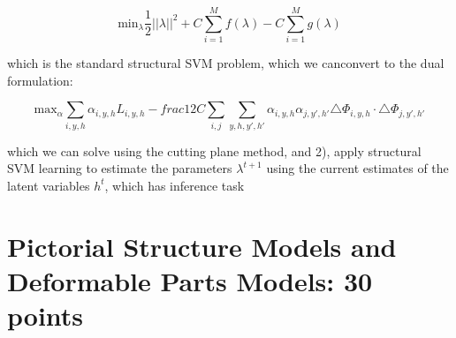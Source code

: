 \documentclass[10pt,onecolumn,letterpaper]{article}
\begin{document}
\begin{enumerate}
$$ \text{min}_\lambda \frac{1}{2}||\lambda||^2 + C\sum_{i=1}^M f(\lambda) - C\sum_{i=1}^M g(\lambda) $$

which is the standard structural SVM problem, which we canconvert to the dual formulation:

$$ \text{max}_{\alpha}\sum_{i,y,h}\alpha_{i,y,h}L_{i,y,h}-
frac{1}{2}C\sum_{i,j}\sum_{y,h,y',h'} \alpha_{i,y,h}\alpha_{j,y',h'}\triangle\Phi_{i,y,h} \cdot \triangle\Phi_{j,y',h'} $$

which we can solve using the cutting plane method, and 2), apply structural SVM learning to estimate the parameters $\lambda^{t+1}$ using the current estimates of the latent variables $h^{t}$, which has inference task

\end{enumerate}

\section*{Pictorial Structure Models and Deformable Parts Models: 30 points}
\end{document}
